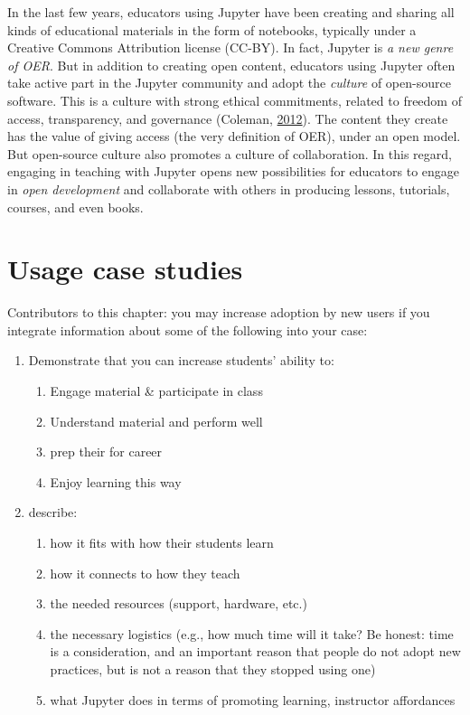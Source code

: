 \documentclass[]{book}
\providecommand{\tightlist}{%
  \setlength{\itemsep}{0pt}\setlength{\parskip}{0pt}}
\begin{document}
In the last few years, educators using Jupyter have been creating and
sharing all kinds of educational materials in the form of notebooks,
typically under a Creative Commons Attribution license (CC-BY). In fact,
Jupyter is \emph{a new genre of OER}. But in addition to creating open
content, educators using Jupyter often take active part in the Jupyter
community and adopt the \emph{culture} of open-source software. This is
a culture with strong ethical commitments, related to freedom of access,
transparency, and governance (Coleman,
\protect\hyperlink{ref-coleman2012coding}{2012}). The content they
create has the value of giving access (the very definition of OER),
under an open model. But open-source culture also promotes a culture of
collaboration. In this regard, engaging in teaching with Jupyter opens
new possibilities for educators to engage in \emph{open development} and
collaborate with others in producing lessons, tutorials, courses, and
even books.

\chapter{Usage case studies}\label{case-studies}

Contributors to this chapter: you may increase adoption by new users if
you integrate information about some of the following into your case:

\begin{enumerate}
\def\labelenumi{\arabic{enumi}.}
\tightlist
\item
  Demonstrate that you can increase students' ability to:

  \begin{enumerate}
  \def\labelenumii{\arabic{enumii}.}
  \tightlist
  \item
    Engage material \& participate in class
  \item
    Understand material and perform well
  \item
    prep their for career
  \item
    Enjoy learning this way
  \end{enumerate}
\item
  describe:

  \begin{enumerate}
  \def\labelenumii{\arabic{enumii}.}
  \tightlist
  \item
    how it fits with how their students learn
  \item
    how it connects to how they teach
  \item
    the needed resources (support, hardware, etc.)
  \item
    the necessary logistics (e.g., how much time will it take? Be
    honest: time is a consideration, and an important reason that people
    do not adopt new practices, but is not a reason that they stopped
    using one)
  \item
    what Jupyter does in terms of promoting learning, instructor
    affordances
  \end{enumerate}
\end{enumerate}
\end{document}
